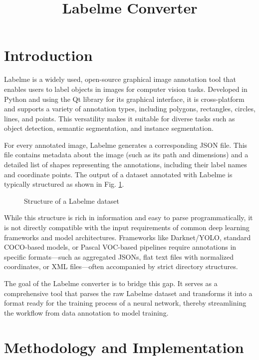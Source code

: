 \documentclass[conference]{IEEEtran}
\title{Labelme Converter}
\author{\IEEEauthorblockN{Author Name}
\IEEEauthorblockA{\textit{Department Name} \\
\textit{Organization Name}\\
City, Country \\
email@domain.com}}
\begin{document}
\maketitle

\section{Introduction}

Labelme is a widely used, open-source graphical image annotation tool that
enables users to label objects in images for computer vision tasks. Developed
in Python and using the Qt library for its graphical interface, it is
cross-platform and supports a variety of annotation types, including polygons,
rectangles, circles, lines, and points. This versatility makes it suitable for
diverse tasks such as object detection, semantic segmentation, and instance
segmentation.

For every annotated image, Labelme generates a corresponding JSON file. This
file contains metadata about the image (such as its path and dimensions) and a
detailed list of shapes representing the annotations, including their label
names and coordinate points. The output of a dataset annotated with Labelme is
typically structured as shown in Fig. \ref{fig:labelme_structure}.

\begin{figure}[htbp]
\caption{Structure of a Labelme dataset}
\label{fig:labelme_structure}
\end{figure}

While this structure is rich in information and easy to parse programmatically,
it is not directly compatible with the input requirements of common deep
learning frameworks and model architectures. Frameworks like Darknet/YOLO,
standard COCO-based models, or Pascal VOC-based pipelines require annotations
in specific formats---such as aggregated JSONs, flat text files with normalized
coordinates, or XML files---often accompanied by strict directory structures.

The goal of the Labelme converter is to bridge this gap. It serves as a
comprehensive tool that parses the raw Labelme dataset and transforms it into a
format ready for the training process of a neural network, thereby streamlining
the workflow from data annotation to model training.

\section{Methodology and Implementation}
\end{document}
